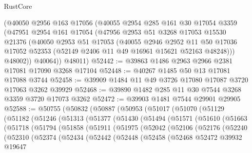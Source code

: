 \begin{lexlean}{RustCore}
\begin{coremodule}
      (@40050
        @2956
        @163
        @17056
        (@40055
          @2954
          @285
          @161
          @30
          @17054
          @3359
          (@47951
            @2954
            @161
            @17054
            (@47956
              @2953
              @51
              @3268
              @17053
              @15530
              @21376
              (@40050
                @2953
                @51
                @17053
                (@40055
                  @2946
                  @2952
                  @11
                  @50
                  @17036
                  @17052
                  @52353
                  (@52149 @2406 @11 @49 @16961 @15621 @52163 @48248)))
              @48002))
          @40064))
      @48011)
@52442 := @39863 @1486 @2963 @2966 @2381 @17081 @17090 @3268 @17104
@52448 := @40267 @1485 @50 @13 @17081 @17088 @3744
@52458 := @39909 @1484 @11 @49 @3726 @17080 @17087 @3720 @17063 @3262 @39929
@52468 := @39890 @1482 @285 @11 @30 @7544 @3268 @3359 @3720 @17073 @3262
@52472 := @39903 @1481 @7544 @29901 @29905
@52588 := @50755
    (@50832
      (@50887
        (@50953
          (@51017
            (@51070
              (@51129
                (@51182
                  (@51246
                    (@51313
                      (@51377
                        (@51430
                          (@51494
                            (@51571
                              (@51610
                                (@51663
                                  (@51718
                                    (@51794
                                      (@51858
                                        (@51911
                                          (@51975
                                            (@52042
                                              (@52106
                                                (@52176
                                                  (@52240
                                                    (@52310
                                                      (@52374
                                                        (@52434
                                                          (@52442
                                                            (@52448
                                                              (@52458
                                                                (@52468
                                                                  @52472
                                                                  @39932
                                                                  @19647

\end{coremodule}
\end{lexlean}
